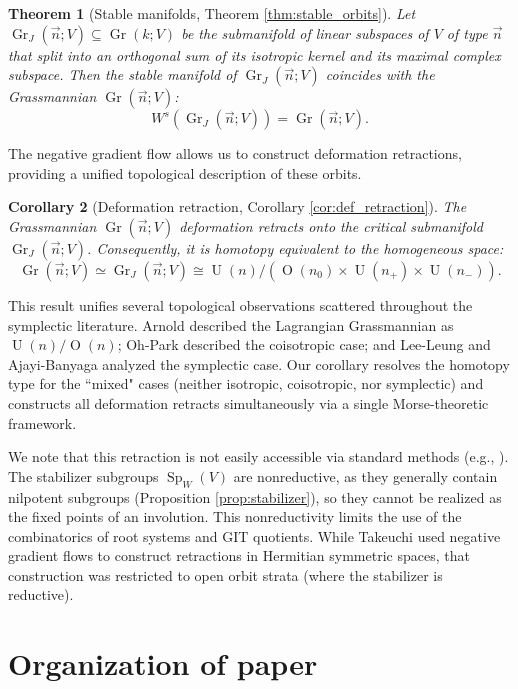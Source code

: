 \documentclass[12pt, final]{article}
\def\Sp{\operatorname{Sp}}
\def\U{\operatorname{U}}
\def\O{\operatorname{O}}
\def\Gr{\operatorname{Gr}}
\newtheorem{theorem}{Theorem}[section]
\newtheorem{corollary}[theorem]{Corollary}
\begin{document}
\begin{theorem}[Stable manifolds, Theorem \ref{thm:stable_orbits}]
Let $\Gr_J(\vec{n}; V) \subseteq \Gr(k; V)$ be the submanifold of linear subspaces of $V$ of type $\vec{n}$ that split into an orthogonal sum of its isotropic kernel and its maximal complex subspace. Then the stable manifold of $\Gr_J(\vec{n}; V)$ coincides with the Grassmannian $\Gr(\vec{n}; V)$:
\[ W^s(\Gr_J(\vec{n}; V)) = \Gr(\vec{n}; V).\]
\end{theorem}

The negative gradient flow allows us to construct deformation retractions, providing a unified topological description of these orbits.

\begin{corollary}[Deformation retraction, Corollary \ref{cor:def_retraction}]
The Grassmannian $\Gr(\vec{n}; V)$ deformation retracts onto the critical submanifold $\Gr_J(\vec{n}; V)$. Consequently, it is homotopy equivalent to the homogeneous space:
\[
   \Gr(\vec{n}; V) \simeq \Gr_J(\vec{n}; V) \cong \U(n) / (\O(n_0) \times \U(n_+) \times \U(n_-)).
\]
\end{corollary}

This result unifies several topological observations scattered throughout the symplectic literature. Arnold \cite{Arnold} described the Lagrangian Grassmannian as $\U(n)/\O(n)$; Oh-Park \cite{OhPark} described the coisotropic case; and Lee-Leung \cite{LeeLeung} and Ajayi-Banyaga \cite{AjayiBanyaga} analyzed the symplectic case. Our corollary resolves the homotopy type for the ``mixed" cases (neither isotropic, coisotropic, nor symplectic) and constructs all deformation retracts simultaneously via a single Morse-theoretic framework.

We note that this retraction is not easily accessible via standard methods (e.g., \cite[Theorem IV. 3.5]{Loos}). The stabilizer subgroups $\Sp_W(V)$ are nonreductive, as they generally contain nilpotent subgroups (Proposition \ref{prop:stabilizer}), so they cannot be realized as the fixed points of an involution. This nonreductivity limits the use of the combinatorics of root systems and GIT quotients. While Takeuchi \cite{Takeuchi} used negative gradient flows to construct retractions in Hermitian symmetric spaces, that construction was restricted to open orbit strata (where the stabilizer is reductive).

\section*{Organization of paper}
\end{document}
